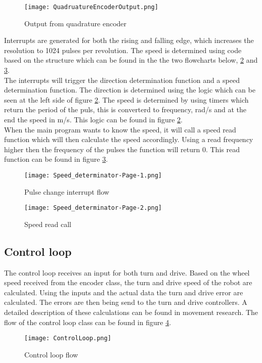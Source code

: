 \begin{figure}[H]
\centering
\texttt{[image: QuadruatureEncoderOutput.png]}
\caption{Output from quadrature encoder}
\label{fig::QuadEnc}
\end{figure}

Interrupts are generated for both the rising and falling edge, which increases the resolution to 1024 pulses per revolution.
The speed is determined using code based on the structure which can be found in the the two flowcharts below, \ref{fig::PCF} and \ref{fig::SRC}.
\\
The interrupts will trigger the direction determination function and a speed determination function.
The direction is determined using the logic which can be seen at the left side of figure \ref{fig::PCF}.
The speed is determined by using timers which return the period of the puls, this is converterd to frequency, rad/s and at the end the speed in m/s.
This logic can be found in figure \ref{fig::PCF}.
\\
When the main program wants to know the speed, it will call a speed read function which will then calculate the speed accordingly. Using a read frequency higher then the frequency of the pulses the function will return 0.
This read function can be found in figure \ref{fig::SRC}.

\begin{figure}[H]
\centering
\texttt{[image: Speed\_determinator-Page-1.png]}
\caption{Pulse change interrupt flow}
\label{fig::PCF}
\end{figure}


\begin{figure}[H]
\centering
\texttt{[image: Speed\_determinator-Page-2.png]}
\caption{Speed read call}
\label{fig::SRC}
\end{figure}

\subsection{Control loop}
The control loop receives an input for both turn and drive. 
Based on the wheel speed received from the encoder class, the turn and drive speed of the robot are calculated. 
Using the inputs and the actual data the turn and drive error are calculated.
The errors are then being send to the turn and drive controllers.
A detailed description of these calculations can be found in movement research. 
The flow of the control loop class can be found in figure \ref{fig::CLF}.

\begin{figure}[H]
\centering
\texttt{[image: ControlLoop.png]}
\caption{Control loop flow}
\label{fig::CLF}
\end{figure}

